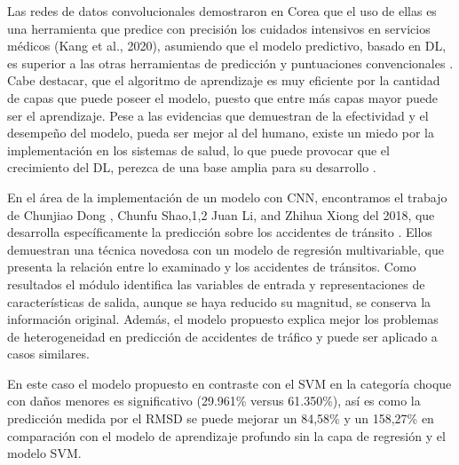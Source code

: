 \par Las redes de datos convolucionales demostraron en Corea que el uso de ellas es una herramienta que predice con precisión los cuidados intensivos en servicios médicos (Kang et al., 2020), asumiendo que el modelo predictivo, basado en DL, es superior a las otras herramientas de predicción y puntuaciones convencionales \cite{Bioetica2022}. Cabe destacar, que el algoritmo de aprendizaje es muy eficiente por la cantidad de capas que puede poseer el modelo, puesto que entre más capas mayor puede ser el aprendizaje. Pese a las evidencias que demuestran de la efectividad y el desempeño del modelo, pueda ser mejor al del humano, existe un miedo por la implementación en los sistemas de salud, lo que puede provocar que el crecimiento del DL, perezca de una base amplia para su desarrollo \cite{Nagendran2020}.\\
\par En el área de la implementación de un modelo con CNN, encontramos el trabajo de Chunjiao Dong , Chunfu Shao,1,2 Juan Li, and Zhihua Xiong del 2018, que desarrolla específicamente la predicción sobre los accidentes de tránsito \cite{shao2018improved}. Ellos demuestran una técnica novedosa con un modelo de regresión multivariable, que presenta la relación entre lo examinado y los accidentes de tránsitos. Como resultados el módulo identifica las variables de entrada y representaciones de características de salida, aunque se haya reducido su magnitud, se conserva la información original. Además, el modelo propuesto explica mejor los problemas de heterogeneidad en predicción de accidentes de tráfico y puede ser aplicado a casos similares.\\
\par En este caso el modelo propuesto en contraste con el SVM en la categoría choque con daños menores es significativo (29.961\% versus 61.350\%), así es como la predicción medida por el RMSD se puede mejorar un  84,58\% y un 158,27\% en comparación con el modelo de aprendizaje profundo sin la capa de regresión y el modelo SVM.\\





